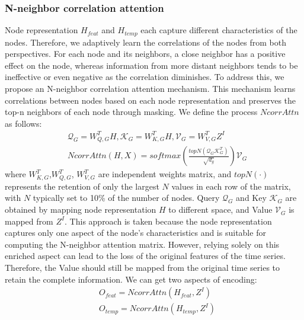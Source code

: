 \subsubsection{N-neighbor correlation attention}
Node representation $H_{feat}$ and $H_{temp}$ each capture different characteristics of the nodes. Therefore, we adaptively learn the correlations of the nodes from both perspectives. For each node and its neighbors, a close neighbor has a positive effect on the node, whereas information from more distant neighbors tends to be ineffective or even negative as the correlation diminishes. To address this, we propose an N-neighbor correlation attention mechanism. This mechanism learns correlations between nodes based on each node representation and preserves the top-n neighbors of each node through masking. We define the process $NcorrAttn$ as follows:
\begin{equation}
    \begin{split}
        &\mathcal{Q}_{G}= {W_{Q,G}^{T}} {H}, \mathcal{K}_{G}= {W_{K,G}^{T}} {H}, \mathcal{V}_{G}= {W_{V,G}^{T}} {Z^I}\\
        &NcorrAttn(H,X)=softmax(\frac{topN(\mathcal{Q}_{G}\mathcal{K}_{G}^{T})}{\sqrt{d_g}})\mathcal{V}_{G}
    \end{split}
\end{equation}
where ${W_{K,G}^{T}}$,${W_{Q,G}^{T}}$, ${W_{V,G}^{T}}$ are independent weights matrix, and $topN(\cdot)$ represents the retention of only the largest $N$ values in each row of the matrix, with $N$ typically set to 10\% of the number of nodes. Query $\mathcal{Q}_{G}$ and Key $\mathcal{K}_{G}$ are obtained by mapping node representation $H$ to different space, and Value $\mathcal{V}_{G}$ is mapped from $Z^I$. This approach is taken because the node representation captures only one aspect of the node's characteristics and is suitable for computing the N-neighbor attention matrix. However, relying solely on this enriched aspect can lead to the loss of the original features of the time series. Therefore, the Value should still be mapped from the original time series to retain the complete information. We can get two aspects of encoding:
\begin{equation}
    \begin{split}
        &O_{feat}= NcorrAttn(H_{feat},Z^{I})\\
        &O_{temp}= NcorrAttn(H_{temp},Z^{I})
    \end{split}
\end{equation}

